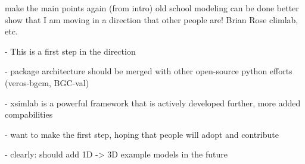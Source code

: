 \documentclass[journal abbreviation, manuscript]{copernicus}
\begin{document}
\conclusions  %
make the main points again (from intro)
old school modeling can be done better
show that I am moving in a direction that other people are! Brian Rose climlab, etc.



- This is a first step in the direction

- package architecture should be merged with other open-source python efforts (veros-bgcm, BGC-val)

- xsimlab is a powerful framework that is actively developed further, more added compabilities

- want to make the first step, hoping that people will adopt and contribute

- clearly: should add 1D -> 3D example models in the future
\end{document}
